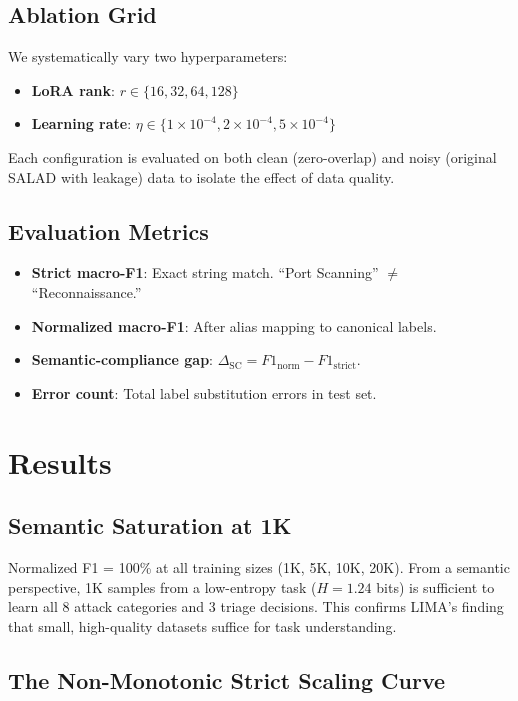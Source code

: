 \documentclass[review,3p]{elsarticle}
\begin{document}
\subsection{Ablation Grid}
We systematically vary two hyperparameters:
\begin{itemize}
\item \textbf{LoRA rank}: $r \in \{16, 32, 64, 128\}$
\item \textbf{Learning rate}: $\eta \in \{1\times10^{-4}, 2\times10^{-4}, 5\times10^{-4}\}$
\end{itemize}
Each configuration is evaluated on both clean (zero-overlap) and noisy (original SALAD with leakage) data to isolate the effect of data quality.

\subsection{Evaluation Metrics}
\begin{itemize}
\item \textbf{Strict macro-F1}: Exact string match. ``Port Scanning'' $\neq$ ``Reconnaissance.''
\item \textbf{Normalized macro-F1}: After alias mapping to canonical labels.
\item \textbf{Semantic-compliance gap}: $\Delta_\text{SC} = F1_\text{norm} - F1_\text{strict}$.
\item \textbf{Error count}: Total label substitution errors in test set.
\end{itemize}

\section{Results}

\subsection{Semantic Saturation at 1K}
Normalized F1 = 100\% at all training sizes (1K, 5K, 10K, 20K). From a semantic perspective, 1K samples from a low-entropy task ($H = 1.24$ bits) is sufficient to learn all 8 attack categories and 3 triage decisions. This confirms LIMA's finding~\cite{zhou2023} that small, high-quality datasets suffice for task understanding.

\subsection{The Non-Monotonic Strict Scaling Curve}
\end{document}
